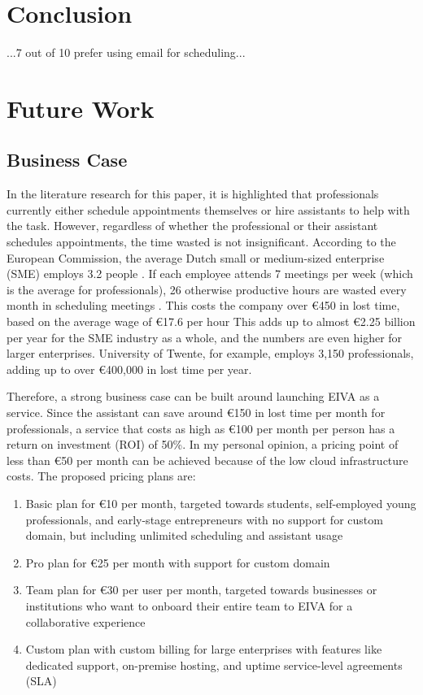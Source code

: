 \documentclass{article}
\begin{document}
\section{Conclusion}

...7 out of 10 prefer using email for scheduling...

\newpage

\section{Future Work}

\subsection{Business Case}

In the literature research for this paper, it is highlighted that professionals currently either schedule appointments themselves or hire assistants to help with the task. However, regardless of whether the professional or their assistant schedules appointments, the time wasted is not insignificant. According to the European Commission, the average Dutch small or medium-sized enterprise (SME) employs 3.2 people \cite{noauthor_2019_2019}. If each employee attends 7 meetings per week (which is the average for professionals), 26 otherwise productive hours are wasted every month in scheduling meetings \cite{kincaid_electronic_1985}. This costs the company over €450 in lost time, based on the average wage of €17.6 per hour \cite{noauthor_salary_nodate} This adds up to almost €2.25 billion per year for the SME industry as a whole, and the numbers are even higher for larger enterprises. University of Twente, for example, employs 3,150 professionals, adding up to over €400,000 in lost time per year.

Therefore, a strong business case can be built around launching EIVA as a service. Since the assistant can save around €150 in lost time per month for professionals, a service that costs as high as €100 per month per person has a return on investment (ROI) of 50\%. In my personal opinion, a pricing point of less than €50 per month can be achieved because of the low cloud infrastructure costs. The proposed pricing plans are:

\begin{enumerate}
	\item Basic plan for €10 per month, targeted towards students, self-employed young professionals, and early-stage entrepreneurs with no support for custom domain, but including unlimited scheduling and assistant usage
	\item Pro plan for €25 per month with support for custom domain
	\item Team plan for €30 per user per month, targeted towards businesses or institutions who want to onboard their entire team to EIVA for a collaborative experience
	\item Custom plan with custom billing for large enterprises with features like dedicated support, on-premise hosting, and uptime service-level agreements (SLA)
\end{enumerate}
\end{document}
